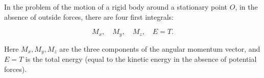 In the problem of the motion of a rigid body around a stationary point $O$, in the absence of outside forces, there are four first integrals:

$$M_x, \quad M_y, \quad M_z, \quad E = T.$$

Here $M_x, M_y, M_z$ are the three components of the angular momentum vector, and $E = T$ is the total energy (equal to the kinetic energy in the absence of potential forces).
